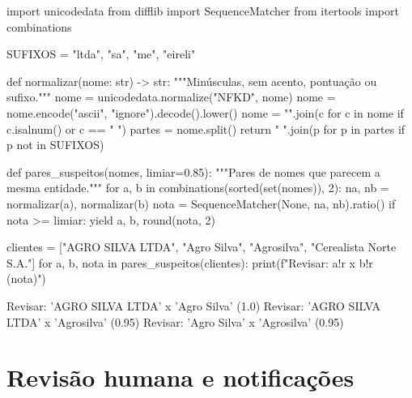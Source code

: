 
\begin{python}
import unicodedata
from difflib import SequenceMatcher
from itertools import combinations

SUFIXOS = {"ltda", "sa", "me", "eireli"}

def normalizar(nome: str) -> str:
    """Minúsculas, sem acento, pontuação ou sufixo."""
    nome = unicodedata.normalize("NFKD", nome)
    nome = nome.encode("ascii", "ignore").decode().lower()
    nome = "".join(c for c in nome if c.isalnum() or c == " ")
    partes = nome.split()
    return " ".join(p for p in partes if p not in SUFIXOS)

def pares_suspeitos(nomes, limiar=0.85):
    """Pares de nomes que parecem a mesma entidade."""
    for a, b in combinations(sorted(set(nomes)), 2):
        na, nb = normalizar(a), normalizar(b)
        nota = SequenceMatcher(None, na, nb).ratio()
        if nota >= limiar:
            yield a, b, round(nota, 2)

clientes = ["AGRO SILVA LTDA", "Agro Silva", "Agrosilva",
            "Cerealista Norte S.A."]
for a, b, nota in pares_suspeitos(clientes):
    print(f"Revisar: {a!r} x {b!r} ({nota})")
\end{python}

\begin{terminal}
Revisar: 'AGRO SILVA LTDA' x 'Agro Silva' (1.0)
Revisar: 'AGRO SILVA LTDA' x 'Agrosilva' (0.95)
Revisar: 'Agro Silva' x 'Agrosilva' (0.95)
\end{terminal}

\section{Revisão humana e notificações}
\label{sec:revisao-notificacao}


